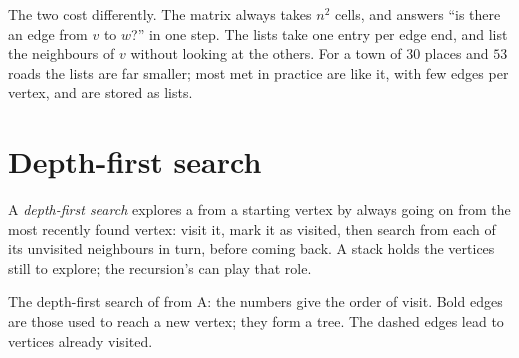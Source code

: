 The two cost differently. The matrix always takes $n^2$ cells, and answers ``is there an edge from $v$ to $w$?'' in one
step. The lists take one entry per edge end, and list the neighbours of $v$ without looking at the others. For a town
of $30$ places and $53$ roads the lists are far smaller; most  met in practice are like it, with few edges per
vertex, and are stored as lists.

\section{Depth-first search}\label{sec:g12:graph-algorithms:dfs}

\begin{method}\label{def:g12:graph-algorithms:dfs}
A \emph{depth-first search} explores a  from a starting vertex by always going on from
the most recently found vertex: visit it, mark it as visited, then search from each of its unvisited neighbours in
turn, before coming back. A stack holds the vertices still to explore; the recursion's  can play that role.
\end{method}

\label{lst:g12:graph-algorithms:dfs}

\label{out:g12:graph-algorithms:dfs}

\begin{omfigure}

{\small The depth-first search of  from A: the numbers give the order of visit. Bold edges are those used to
reach a new vertex; they form a tree. The dashed edges lead to vertices already visited.}
\end{omfigure}

